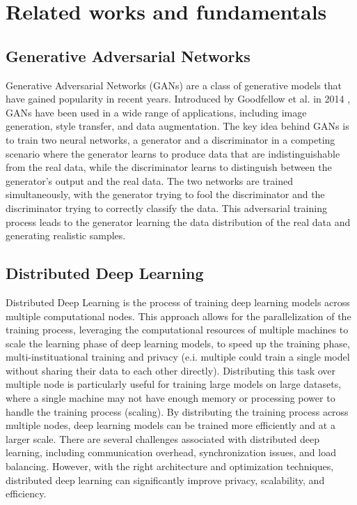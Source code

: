 \chapter{Related works and fundamentals}

\section{Generative Adversarial Networks}
Generative Adversarial Networks (GANs) are a class of generative models that have gained popularity in recent years. Introduced by Goodfellow et al. in 2014 \cite{goodfellow2014generative}, GANs have been used in a wide range of applications, including image generation, style transfer, and data augmentation. The key idea behind GANs is to train two neural networks, a generator and a discriminator in a competing scenario where the generator learns to produce data that are indistinguishable from the real data, while the discriminator learns to distinguish between the generator's output and the real data. The two networks are trained simultaneously, with the generator trying to fool the discriminator and the discriminator trying to correctly classify the data. This adversarial training process leads to the generator learning the data distribution of the real data and generating realistic samples.

\section{Distributed Deep Learning}
Distributed Deep Learning is the process of training deep learning models across multiple computational nodes. This approach allows for the parallelization of the training process, leveraging the computational resources of multiple machines to scale the learning phase of deep learning models, to speed up the training phase, multi-instituational training and privacy (e.i. multiple could train a single model without sharing their data to each other directly). Distributing this task over multiple node is particularly useful for training large models on large datasets, where a single machine may not have enough memory or processing power to handle the training process (scaling). By distributing the training process across multiple nodes, deep learning models can be trained more efficiently and at a larger scale. There are several challenges associated with distributed deep learning, including communication overhead, synchronization issues, and load balancing. However, with the right architecture and optimization techniques, distributed deep learning can significantly improve privacy, scalability, and efficiency.

